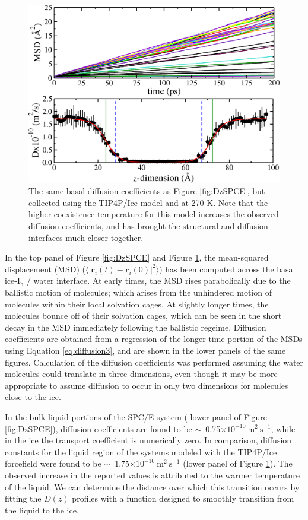 \begin{figure}
\includegraphics[width=\linewidth]{Figures/DzTIP4PIce}
\caption{\label{fig:DzTIP4PIce} The same basal diffusion coefficients
  as Figure \ref{fig:DzSPCE}, but collected using the TIP4P/Ice model
  and at 270 K. Note that the higher coexistence temperature for this
  model increases the observed diffusion coefficients, and has brought
  the structural and diffusion interfaces much closer together.}
\end{figure}

In the top panel of Figure \ref{fig:DzSPCE} and Figure
\ref{fig:DzTIP4PIce}, the mean-squared displacement (MSD)
($\langle | \mathbf{r}_i(t) - \mathbf{r}_i(0) |^2 \rangle $) has been
computed across the basal ice-I$_\mathrm{h}$ / water interface. At
early times, the MSD rises parabolically due to the ballistic motion
of molecules; which arises from the unhindered motion of molecules
within their local solvation cages. At slightly longer times, the
molecules bounce off of their solvation cages, which can be seen in
the short decay in the MSD immediately following the ballistic
regeime. Diffusion coefficients are obtained from a regression of the
longer time portion of the MSDs using Equation \eqref{eq:diffusion3}, and
are shown in the lower panels of the same figures. Calculation of the
diffusion coefficients was performed assuming the water molecules
could translate in three dimensions, even though it may be more
appropriate to assume diffusion to occur in only two dimensions for
molecules close to the ice.

In the bulk liquid portions of the SPC/E system ( lower panel of
Figure \ref{fig:DzSPCE}), diffusion coefficients are found to be
$\sim$~0.75$\times 10^{-10}~\mathrm{m}^{2}~\mathrm{s}^{-1 }$, while in
the ice the transport coefficient is numerically zero. In comparison,
diffusion constants for the liquid region of the systems modeled with
the TIP4P/Ice forcefield were found to be
$\sim$~1.75$\times 10^{-10}~\mathrm{m}^{2}~\mathrm{s}^{-1 }$ (lower
panel of Figure \ref{fig:DzTIP4PIce}). The observed increase in the
reported values is attributed to the warmer temperature of the
liquid. We can determine the distance over which this transition
occurs by fitting the $D(z)$ profiles with a function designed to
smoothly transition from the liquid to the ice.

